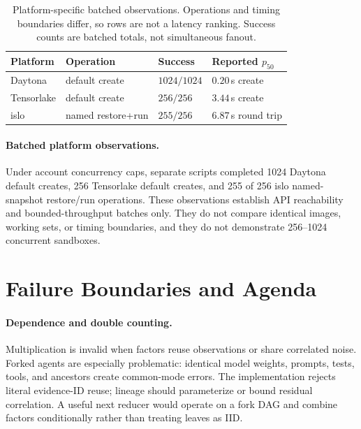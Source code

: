 \begin{table}[t]
\centering\footnotesize
\caption{Platform-specific batched observations. Operations and timing boundaries differ, so rows are not a latency ranking. Success counts are batched totals, not simultaneous fanout.}
\label{tab:fanout}
\begin{tabularx}{\columnwidth}{@{}l>{\raggedright\arraybackslash}Xl>{\raggedright\arraybackslash}X@{}}
\toprule
Platform & Operation & Success & Reported $p_{50}$ \\
\midrule
Daytona & default create & $1024/1024$ & $0.20$\,s create \\
Tensorlake & default create & $256/256$ & $3.44$\,s create \\
islo & named restore+run & $255/256$ & $6.87$\,s round trip \\
\bottomrule
\end{tabularx}
\end{table}

\paragraph{Batched platform observations.} Under account concurrency caps, separate scripts completed 1024 Daytona default creates, 256 Tensorlake default creates, and 255 of 256 islo named-snapshot restore/run operations. These observations establish API reachability and bounded-throughput batches only. They do not compare identical images, working sets, or timing boundaries, and they do not demonstrate 256--1024 concurrent sandboxes.

\section{Failure Boundaries and Agenda}
\label{sec:agenda}

\paragraph{Dependence and double counting.} Multiplication is invalid when factors reuse observations or share correlated noise. Forked agents are especially problematic: identical model weights, prompts, tests, tools, and ancestors create common-mode errors. The implementation rejects literal evidence-ID reuse; lineage should parameterize or bound residual correlation. A useful next reducer would operate on a fork DAG and combine factors conditionally rather than treating leaves as IID.

